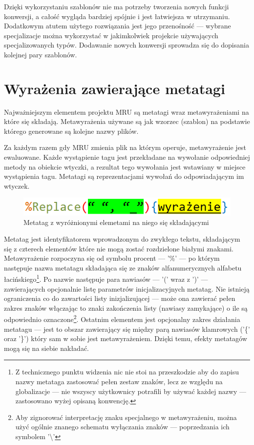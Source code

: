 \par
Dzięki wykorzystaniu szablonów nie ma potrzeby tworzenia nowych funkcji konwersji, a całość wygląda bardziej spójnie i jest łatwiejsza w utrzymaniu. Dodatkowym atutem użytego rozwiązania jest jego przenośność --- wybrane specjalizacje można wykorzystać w jakimkolwiek projekcie używających specjalizowanych typów. Dodawanie nowych konwersji sprowadza się do dopisania kolejnej pary szablonów.

\section{Wyrażenia zawierające metatagi}
Najważniejszym elementem projektu MRU są metatagi wraz metawyrażeniami na które się składają.
Metawyrażenia używane są jak wzorzec (szablon) na podstawie którego generowane są kolejne nazwy plików.

\par
Za każdym razem gdy MRU zmienia plik na którym operuje, metawyrażenie jest ewaluowane. Każde wystąpienie tagu jest przekładane na wywołanie odpowiedniej metody na obiekcie wtyczki, a rezultat tego wywołania jest wstawiany w miejsce wystąpienia tagu.
Metatagi są reprezentacjami wywołań do odpowiadającym im wtyczek.

\begin{figure}
\begin{center}
\includegraphics[scale=0.50]{img/metatag_sample.png}
\end{center}
\caption{Metatag z wyróżnionymi elemetami na niego się składającymi}
\end{figure}

\par
Metatag jest identyfikatorem wprowadzonym do zwykłego tekstu, składającym się z czterech elementów które nie mogą zostać rozdzielone białymi znakami. Metawyrażenie rozpoczyna się od symbolu procent --- '\%' --- po którym następuje nazwa metatagu składająca się ze znaków alfanumerycznych alfabetu łacińskiego\footnote{Z technicznego punktu widzenia nic nie stoi na przeszkodzie aby do zapisu nazwy metataga zastosować pełen zestaw znaków, lecz ze względu na globalizacje --- nie wszyscy użytkownicy potrafili by używać każdej nazwy --- zastosowano wyżej opisaną konwencję.}.
Po nazwie następuje para nawiasów --- '(' wraz z ')' --- zawierających opcjonalnie listę parametrów inicjalizacyjnych metatag. Nie istnieją ograniczenia co do zawartości listy inizjalizującej --- może ona zawierać pełen zakres znaków włączając to znaki zakończenia listy (nawiasy zamykające) o ile są odpowiednio oznaczone\footnote{Aby zignorować interpretację znaku specjalnego w metawyrażeniu, można użyć ogólnie znanego schematu wyłączania znaków --- poprzedzania ich symbolem '\textbackslash'}.
Ostatnim elementem jest opcjonalny zakres działania metatagu --- jest to obszar zawierający się między parą nawiasów klamrowych ('\{' oraz '\}') który sam w sobie jest metawyrażeniem. Dzięki temu, efekty metatagów mogą się na siebie nakładać.

